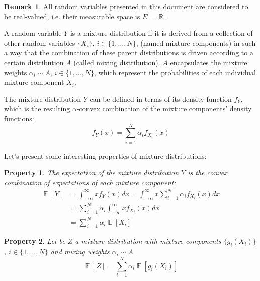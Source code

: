 \documentclass[12pt,a4paper,openright,twoside]{article}
\DeclareMathOperator*{\E}{\mathbb{E}}
\DeclareMathOperator*{\R}{\mathbb{R}}
\numberwithin{equation}{section}
\theoremstyle{definition}
\newtheorem*{remark}{Remark}
\theoremstyle{remark}
\theoremstyle{plain}
\newtheorem{mixtureProperty}{Property}
\begin{document}
\begin{remark}
All random variables presented in this document are considered to be real-valued, i.e. their measurable space is $E= \R$. 
\end{remark}

A random variable $Y$ is a mixture distribution if it is derived from a collection of other random variables $\{X_i\}$, $i\in \{1, \dots, N\}$, (named mixture components) in such a way that the combination of these parent distributions is driven according to a certain distribution $A$ (called mixing distribution). $A$ encapsulates the mixture weights $\alpha_i \sim A$, $i\in \{1, \dots, N\}$, which represent the probabilities of each individual mixture component $X_i$. 

The mixture distribution $Y$ can be defined in terms of its density function $f_Y$, which is the resulting $\alpha$-convex combination of the mixture components' density functions:
\begin{equation} \label{mixtureDef}
    f_{Y} (x) = \sum_{i=1}^{N} \alpha _i f_{X_i}(x)
\end{equation}

Let's present some interesting properties of mixture distributions:

\begin{mixtureProperty} \label{mixtureProperty1}
	The expectation of the mixture distribution $Y$ is the convex combination of expectations of each mixture component: 
    \begin{equation} \label{mixtureProperty1eq}
    \begin{split}
        \E [Y] &= \int_{-\infty}^{\infty} x f_{Y}(x) dx = \int_{-\infty}^{\infty} x \sum_{i=1}^{N} \alpha_i f_{X_i}(x) dx \\
        &= \sum_{i=1}^{N} \alpha_i \int_{-\infty}^{\infty} x f_{X_i}(x) dx \\
        &= \sum_{i=1}^{N} \alpha_i \E [X_i]
    \end{split}
    \end{equation}
\end{mixtureProperty}


\begin{mixtureProperty} \label{mixtureProperty2}
	Let be $Z$ a mixture distribution with mixture components $\{g_i(X_i)\}$, $i\in \{1, \dots, N\}$ and mixing weights $\alpha_i \sim A$
    \begin{equation} \label{mixtureProperty2eq}
        \E [Z] = \sum_{i=1}^{N} \alpha_i \E [g_i(X_i)]
    \end{equation}
\end{mixtureProperty}
\end{document}
